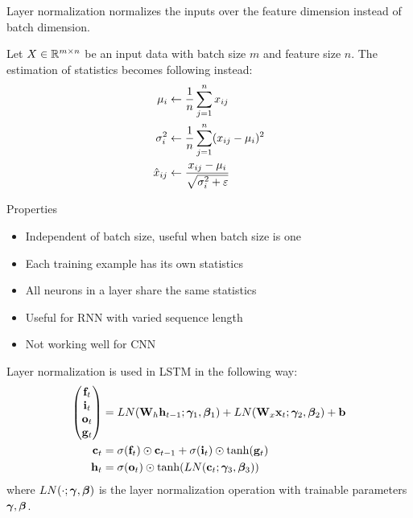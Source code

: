 \documentclass{article}
\begin{document}
Layer normalization normalizes the inputs over the feature dimension instead of batch dimension. 

Let $X\in\mathbb{R}^{m\times n}$ be an input data with batch size $m$ and feature size $n$. The estimation of statistics becomes following instead:
\begin{align*}
    \mu_i &\leftarrow \frac{1}{ {n} } \sum_{ {j}={1} }^{ {n} }x_{ij} \\
    \sigma_i^2 &\leftarrow \frac{1}{ {n} } \sum_{ {j}={1} }^{ {n} }(x_{ij} - \mu_i)^2 \\
    \hat{x}_{ij} &\leftarrow \frac{x_{ij} - \mu_i}{\sqrt{\sigma_i^2 + \varepsilon}}
\end{align*}

Properties
\begin{itemize}
    \item Independent of batch size, useful when batch size is one
    \item Each training example has its own statistics
    \item All neurons in a layer share the same statistics
    \item Useful for RNN with varied sequence length
    \item Not working well for CNN
\end{itemize}

Layer normalization is used in LSTM in the following way:
\begin{align*}
    \begin{pmatrix}
        \mathbf{f}_t \\
        \mathbf{i}_t \\
        \mathbf{o}_t \\
        \mathbf{g}_t \\
    \end{pmatrix} &= LN(\mathbf{W}_h \mathbf{h}_{t-1}; \bm{\gamma}_1, \bm{\beta}_1) + LN(\mathbf{W}_x \mathbf{x}_t; \bm{\gamma}_2, \bm{\beta}_2) + \mathbf{b} \\
    \mathbf{c}_t &= \sigma(\mathbf{f}_t)\odot\mathbf{c}_{t-1} + \sigma(\mathbf{i}_t)\odot\tanh(\mathbf{g}_t) \\
    \mathbf{h}_t &= \sigma(\mathbf{o}_t)\odot\tanh(LN(\mathbf{c}_t; \bm{\gamma}_3, \bm{\beta}_3))
\end{align*}
where $LN(\cdot; \bm{\gamma}, \bm{\beta})$ is the layer normalization operation with trainable parameters $\bm{\gamma}, \bm{\beta}$.

\printbibliography
\end{document}
